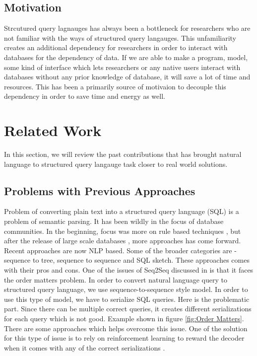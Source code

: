 \documentclass[12pt]{article}
\begin{document}
\subsection{Motivation}
Strcutured query lagnauges has always been a bottleneck for researchers who are not familiar with the ways of structured query langauges. This unfamiliarity creates an additional dependency for researchers in order to interact with databases for the dependency of data. If we are able to make a program, model, some kind of interface which lets researchers or any native users interact with databases without any prior knowledge of database, it will save a lot of time and resources. This has been a primarily source of motivaion to decouple this dependency in order to save time and energy as well. 




\newpage

\section{Related Work}

In this section, we will review the past contributions that has brought natural language to structured query langauge task closer to real world solutions. 

\subsection{Problems with Previous Approaches}

Problem of converting plain text into a structured query language (SQL) is a problem of semantic parsing. It has been wildly in the focus of database communities. In the beginning, focus was more on rule based techniques \cite{setlur2016eviza}, but after the release of large scale databases \cite{yu2018spider} \cite{zhong2017seq2sql}, more approaches has come forward. Recent approaches are now NLP based. Some of the broader categories are - sequence to tree, sequence to sequence and SQL sketch. These approaches comes with their pros and cons. One of the issues of Seq2Seq discussed in \cite{xu2017sqlnet} is that it faces the order matters problem. In order to convert natural language query to
structured query language, we use sequence-to-sequence style model. In order to use this type of model, we have to serialize SQL queries. Here is the problematic part. Since there can be multiple correct queries, it creates different serializations for each query which is not good. Example shown in figure \ref{fig:Order Matters}. There are some approaches which helps overcome this issue. One of the solution for this type of issue is to rely on reinforcement learning to reward the decoder when it comes with any of the correct serializations \cite{xu2017sqlnet}. 
\end{document}

